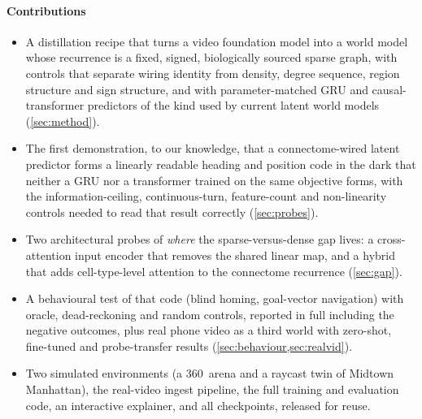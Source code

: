 \paragraph{Contributions}
\begin{itemize}
  \item A distillation recipe that turns a video foundation model into a world model whose recurrence is a fixed,
        signed, biologically sourced sparse graph, with controls that separate wiring identity from density, degree
        sequence, region structure and sign structure, and with parameter-matched GRU and causal-transformer
        predictors of the kind used by current latent world models (\cref{sec:method}).
  \item The first demonstration, to our knowledge, that a connectome-wired latent predictor forms a linearly readable
        heading and position code in the dark that neither a GRU nor a transformer trained on the same objective forms,
        with the information-ceiling, continuous-turn, feature-count and non-linearity controls needed to read that
        result correctly (\cref{sec:probes}).
  \item Two architectural probes of \emph{where} the sparse-versus-dense gap lives: a cross-attention input encoder
        that removes the shared linear map, and a hybrid that adds cell-type-level attention to the connectome
        recurrence (\cref{sec:gap}).
  \item A behavioural test of that code (blind homing, goal-vector navigation) with oracle, dead-reckoning and random
        controls, reported in full including the negative outcomes, plus real phone video as a third world with
        zero-shot, fine-tuned and probe-transfer results (\cref{sec:behaviour,sec:realvid}).
  \item Two simulated environments (a 360\degree\ arena and a raycast twin of Midtown Manhattan), the real-video ingest
        pipeline, the full training and evaluation code, an interactive explainer, and all checkpoints, released for
        reuse.
\end{itemize}
